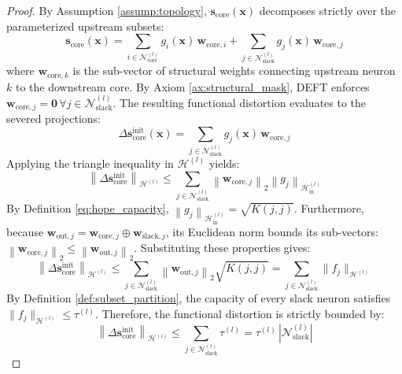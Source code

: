 \documentclass[11pt, a4paper, copyright, gdm]{google}
\newcommand{\norm}[1]{\left\lVert#1\right\rVert}
\newcommand{\sVect}{\boldsymbol{s}}
\newcommand{\wVect}{\boldsymbol{w}}
\newcommand{\xVect}{\boldsymbol{x}}
\newcommand{\zeroVect}{\boldsymbol{0}}
\newcommand{\calH}{\mathcal{H}}
\newcommand{\calN}{\mathcal{N}}
\theoremstyle{definition}
\begin{document}
\begin{proof}
By Assumption \ref{assump:topology}, $\sVect_{\text{core}}(\xVect)$ decomposes strictly over the parameterized upstream subsets:
\begin{equation}
    \sVect_{\text{core}}(\xVect) = \sum_{i \in \calN_{\text{core}}^{(l)}} g_i(\xVect) \, \wVect_{\text{core},i} + \sum_{j \in \calN_{\text{slack}}^{(l)}} g_j(\xVect) \, \wVect_{\text{core},j}
\end{equation}
where $\wVect_{\text{core},k}$ is the sub-vector of structural weights connecting upstream neuron $k$ to the downstream core. By Axiom \ref{ax:structural_mask}, DEFT enforces $\wVect_{\text{core},j} = \zeroVect \, \forall j \in \calN_{\text{slack}}^{(l)}$. The resulting functional distortion evaluates to the severed projections:
\begin{equation}
    \Delta \sVect_{\text{core}}^{\text{init}}(\xVect) = \sum_{j \in \calN_{\text{slack}}^{(l)}} g_j(\xVect) \, \wVect_{\text{core},j}
\end{equation}
Applying the triangle inequality in $\calH^{(l)}$ yields:
\begin{equation}
    \norm{\Delta \sVect_{\text{core}}^{\text{init}}}_{\calH^{(l)}} \le \sum_{j \in \calN_{\text{slack}}^{(l)}} \norm{\wVect_{\text{core},j}}_2 \norm{g_j}_{\calH_{\text{in}}^{(l)}}
\end{equation}
By Definition \ref{eq:hope_capacity}, $\norm{g_j}_{\calH_{\text{in}}^{(l)}} = \sqrt{K(j,j)}$. Furthermore, because $\wVect_{\text{out},j} = \wVect_{\text{core},j} \oplus \wVect_{\text{slack},j}$, its Euclidean norm bounds its sub-vectors: $\norm{\wVect_{\text{core},j}}_2 \le \norm{\wVect_{\text{out},j}}_2$. Substituting these properties gives:
\begin{equation}
    \norm{\Delta \sVect_{\text{core}}^{\text{init}}}_{\calH^{(l)}} \le \sum_{j \in \calN_{\text{slack}}^{(l)}} \norm{\wVect_{\text{out},j}}_2 \sqrt{K(j,j)} = \sum_{j \in \calN_{\text{slack}}^{(l)}} \|f_j\|_{\calH^{(l)}}
\end{equation}
By Definition \ref{def:subset_partition}, the capacity of every slack neuron satisfies $\|f_j\|_{\calH^{(l)}} \le \tau^{(l)}$. Therefore, the functional distortion is strictly bounded by:
\begin{equation}
    \norm{\Delta \sVect_{\text{core}}^{\text{init}}}_{\calH^{(l)}} \le \sum_{j \in \calN_{\text{slack}}^{(l)}} \tau^{(l)} = \tau^{(l)} \, |\calN_{\text{slack}}^{(l)}|
\end{equation}
\end{proof}
\end{document}
